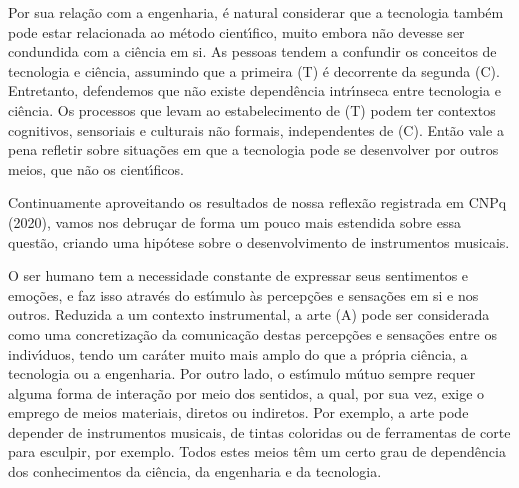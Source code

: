 \documentclass[
12pt,		%
openright,	%
twoside,  %
a4paper,			%
chapter=TITLE,		%
english,			%
french,				%
spanish,			%
brazil				%
]{USPSC-classe/USPSC}
\begin{document}
Por sua rela\c{c}\~ao com a engenharia, \'e natural considerar que a tecnologia tamb\'em pode estar relacionada ao m\'etodo cient\'{\i}fico, muito embora n\~ao devesse ser condundida com a ci\^encia em si. As pessoas tendem a confundir os conceitos de tecnologia e ci\^encia, assumindo que a primeira (T) \'e decorrente da segunda (C). Entretanto, defendemos que n\~ao existe depend\^encia intr\'{\i}nseca entre tecnologia e ci\^encia. Os processos que levam ao estabelecimento de (T) podem ter contextos cognitivos, sensoriais e culturais n\~ao formais, independentes de (C). Ent\~ao vale a pena refletir sobre situa\c{c}\~oes em que a tecnologia pode se desenvolver por outros meios, que n\~ao os cient\'{\i}ficos.

















Continuamente aproveitando os resultados de nossa reflex\~ao registrada em  CNPq (2020), vamos nos debru\c{c}ar de forma um pouco mais estendida sobre essa quest\~ao, criando uma hip\'otese sobre o desenvolvimento de instrumentos musicais.

















O ser humano tem a necessidade constante de expressar seus sentimentos e emo\c{c}\~oes, e faz isso atrav\'es do est\'{\i}mulo \`as percep\c{c}\~oes e sensa\c{c}\~oes em si e nos outros. Reduzida a um contexto instrumental, a arte (A) pode ser considerada como uma concretiza\c{c}\~ao da comunica\c{c}\~ao destas percep\c{c}\~oes e sensa\c{c}\~oes entre os indiv\'{\i}duos, tendo um car\'ater muito mais amplo do que a pr\'opria ci\^encia, a tecnologia ou a engenharia. Por outro lado, o est\'{\i}mulo m\'utuo sempre requer alguma forma de intera\c{c}\~ao por meio dos sentidos, a qual, por sua vez, exige o emprego de meios materiais, diretos ou indiretos. Por exemplo, a arte pode depender de instrumentos musicais, de tintas coloridas ou de ferramentas de corte para esculpir, por exemplo. Todos estes meios t\^em um certo grau de depend\^encia dos conhecimentos da ci\^encia, da engenharia e da tecnologia.
\end{document}
